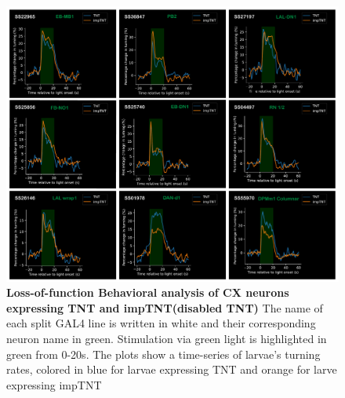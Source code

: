     \begin{figure}
        \centering
        \includegraphics[width=12cm]{Figs/CX/BehaviourAssays.pdf}
        \caption[Loss of Function Analysis during Light Stimulation]{\textbf{Loss-of-function Behavioral analysis of CX neurons expressing TNT and impTNT(disabled TNT)} The name of each split GAL4 line is written in white and their corresponding neuron name in green. Stimulation via green light is highlighted in green from 0-20s. The plots show a time-series of larvae's turning rates, colored in blue for larvae expressing TNT and orange for larve expressing impTNT}
        \label{LOS}
    \end{figure}

